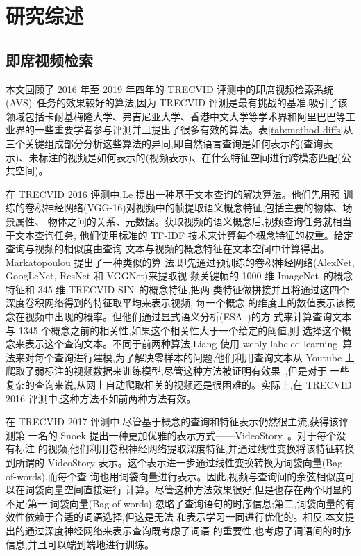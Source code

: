 \chapter{研究综述}

\section{即席视频检索}

本文回顾了 2016 年至 2019 年四年的 TRECVID 评测中的即席视频检索系统(AVS)~\cite{awad2016trecvid,awad2017trecvid,awad2018trecvid,awad2019trecvid}任务的效果较好的算法,因为 TRECVID 评测是最有挑战的基准,吸引了该领域包括卡耐基梅隆大学、弗吉尼亚大学、香港中文大学等学术界和阿里巴巴等工业界的一些重要学者参与评测并且提出了很多有效的算法。表\ref{tab:method-diffs}从三个关键组成部分分析这些算法的异同,即自然语言查询是如何表示的(查询表示)、未标注的视频是如何表示的(视频表示)、在什么特征空间进行跨模态匹配(公共空间)。



在 TRECVID 2016 评测中,Le \etal\cite{le2016nii}提出一种基于文本查询的解决算法。他们先用预
训练的卷积神经网络(VGG-16)对视频中的帧提取语义概念特征,包括主要的物体、场景属性、
物体之间的关系、元数据。获取视频的语义概念后,视频查询任务就相当于文本查询任务,
他们使用标准的 TF-IDF 技术来计算每个概念特征的权重。给定查询与视频的相似度由查询
文本与视频的概念特征在文本空间中计算得出。Markatopoulou \etal\cite{foteini2016iti}提出了一种类似的算
法,即先通过预训练的卷积神经网络(AlexNet, GoogLeNet, ResNet 和 VGGNet)来提取视
频关键帧的 1000 维 ImageNet~\cite{russakovsky2015imagenet}的概念特征和 345 维 TRECVID SIN~\cite{smeaton2009high}的概念特征,把两
类特征做拼接并且将通过这四个深度卷积网络得到的特征取平均来表示视频, 每一个概念
的维度上的数值表示该概念在视频中出现的概率。但他们通过显式语义分析(ESA~\cite{gabrilovich2007computing})的方
式来计算查询文本与 1345 个概念之前的相关性,如果这个相关性大于一个给定的阈值,则
选择这个概念来表示这个查询文本。不同于前两种算法,Liang \etal\cite{liang2016inf}使用 webly-labeled
learning~\cite{liang2016learning}算法来对每个查询进行建模,为了解决零样本的问题,他们利用查询文本从
Youtube 上爬取了弱标注的视频数据来训练模型,尽管这种方法被证明有效果~\cite{kordumova2015best},但是对于
一些复杂的查询来说,从网上自动爬取相关的视频还是很困难的。实际上,在 TRECVID 2016
评测中,这种方法不如前两种方法有效。

在 TRECVID 2017 评测中,尽管基于概念的查询和特征表示仍然很主流,获得该评测第
一名的 Snoek \etal\cite{snoek2017university}提出一种更加优雅的表示方式——VideoStory~\cite{habibian2014videostory}。对于每个没有标注
的视频,他们利用卷积神经网络提取深度特征,并通过线性变换将该特征转换到所谓的
VideoStory 表示。这个表示进一步通过线性变换转换为词袋向量(Bag-of-words),而每个查
询也用词袋向量进行表示。因此,视频与查询间的余弦相似度可以在词袋向量空间直接进行
计算。尽管这种方法效果很好,但是也存在两个明显的不足:第一,词袋向量(Bag-of-words)
忽略了查询语句的时序信息;第二,词袋向量的有效性依赖于合适的词语选择,但这是无法
和表示学习一同进行优化的。相反,本文提出的通过深度神经网络来表示查询既考虑了词语
的重要性,也考虑了词语间的时序信息,并且可以端到端地进行训练。

